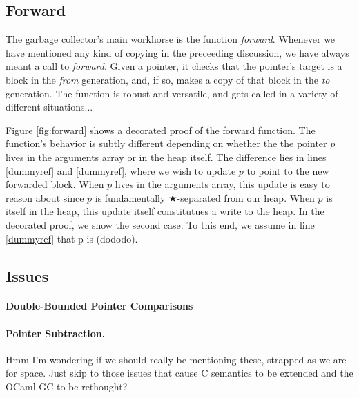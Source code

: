 \subsection{Forward}
\label{sec:gcforward}
The garbage collector's main workhorse is the function \emph{forward}.
Whenever we have mentioned any kind of copying in the preceeding 
discussion, we have always meant a call to \emph{forward}. 
Given a pointer, it checks that the pointer's target is a block
in the \emph{from} generation, and, if so, 
makes a copy of that block in the \emph{to} generation. The function 
is robust and versatile, and gets called in a variety of different 
situations... 

Figure \ref{fig:forward} shows a decorated proof of the forward function.
The function's behavior is subtly different depending on 
whether the the pointer $p$ lives in the arguments array or in the 
heap itself. The difference lies in lines \ref{dummyref} and \ref{dummyref}, where 
we wish to update $p$ to point to the new forwarded block. 
When $p$ lives in the arguments array, this update is easy to 
reason about since $p$ is fundamentally $\bigstar$-separated from our heap. 
When $p$ is itself in the heap, this update itself constitutues a
write to the heap. In the decorated proof, we show the second 
case. To this end, we assume in line \ref{dummyref} that p is (dododo). 



\subsection{Issues}
\label{sec:gccsemantics}
\paragraph{Double-Bounded Pointer Comparisons}
\paragraph{Pointer Subtraction.}
{\color{blue}Hmm I'm wondering if we should really be mentioning these,
strapped as we are for space. Just skip to those issues that cause C semantics to be 
extended and the OCaml GC to be rethought?}










